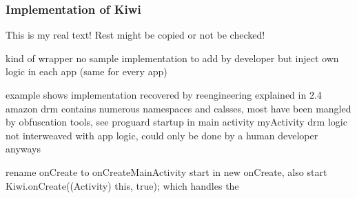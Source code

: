 \subsubsection{Implementation of Kiwi}\label{section:license-amazon-implementation}
This is my real text! Rest might be copied or not be checked!

%
kind of wrapper
no sample implementation to add by developer but inject own logic in each app (same for every app)

example shows implementation recovered by reengineering explained in 2.4
amazon drm contains numerous namespaces and calsses, most have been mangled by obfuscation tools, see proguard
startup in main activity myActivity
drm logic not interweaved with app logic, could only be done by a human developer anyways\cite{munteanLicense}
%




rename onCreate to onCreateMainActivity
start in new onCreate, also start Kiwi.onCreate((Activity) this, true); which handles the
